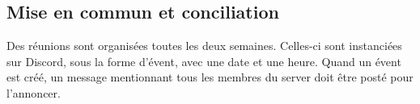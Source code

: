 \subsection{Mise en commun et conciliation}
	Des réunions sont organisées toutes les deux semaines. Celles-ci sont instanciées sur Discord, sous la forme d'évent, avec une date et une heure. Quand un évent est créé, un message mentionnant tous les membres du server doit être posté pour l'annoncer.
